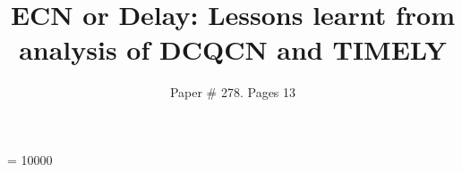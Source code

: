 \documentclass{sig-alternate-10pt}
\begin{document}
\widowpenalty = 10000

\title{ECN or Delay: Lessons learnt from analysis of DCQCN and TIMELY}

\author{Paper \# 278. Pages 13}

\maketitle


%




%



\clearpage



%
\end{document}
